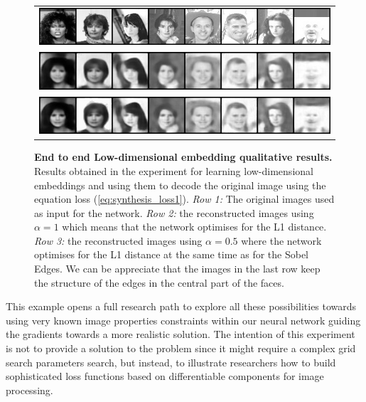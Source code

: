 \begin{figure}
    \begin{center}
        \begin{tabular}{c}
        \includegraphics[width=\textwidth]{main/chapter03/data/synthesis/celeb_gray.jpg} \\
        \includegraphics[width=\textwidth]{main/chapter03/data/synthesis/celeb_gray_l1.jpg} \\
        \includegraphics[width=\textwidth]{main/chapter03/data/synthesis/celeb_gray_l1+sobel.jpg} \\
        \end{tabular}
    \end{center}
    \caption[End to end Low-dimensional embedding qualitative results]{\textbf{End to end Low-dimensional embedding qualitative results.} Results obtained in the experiment for learning low-dimensional embeddings and using them to decode the original image using the equation loss (\ref{eq:synthesis_loss1}). \textit{Row 1:} The original images used as input for the network. \textit{Row 2:} the reconstructed images using $\alpha = 1$ which means that the network optimises for the L1 distance. \textit{Row 3:} the reconstructed images using $\alpha = 0.5$ where the network optimises for the L1 distance at the same time as for the Sobel Edges. We can be appreciate that the images in the last row keep the structure of the edges in the central part of the faces.}
    \label{fig:synthesis}
\end{figure}

This example opens a full research path to explore all these possibilities towards using very known image properties constraints within our neural network guiding the gradients towards a more realistic solution. The intention of this experiment is not to provide a solution to the problem since it might require a complex grid search parameters search, but instead,  to illustrate researchers how to build sophisticated loss functions based on \lib{} differentiable components for image processing.

